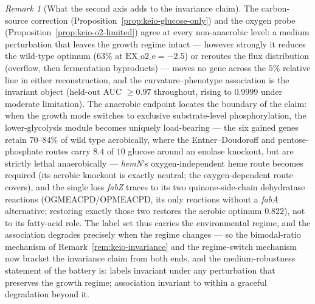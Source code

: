 \documentclass[11pt,a4paper]{article}
\theoremstyle{plain}
\theoremstyle{definition}
\theoremstyle{remark}
\newtheorem{remark}[theorem]{Remark}
\begin{document}
\begin{remark}[What the second axis adds to the invariance claim]
\label{rem:keio-o2-invariance}
The carbon-source correction
(Proposition~\ref{prop:keio-glucose-only}) and the oxygen probe
(Proposition~\ref{prop:keio-o2-limited}) agree at every
non-anaerobic level: a medium perturbation that leaves the growth
regime intact --- however strongly it reduces the wild-type optimum
($63\%$ at $\mathrm{EX\_o2\_e}=-2.5$) or reroutes the flux
distribution (overflow, then fermentation byproducts) --- moves no
gene across the $5\%$ relative line in either reconstruction, and
the curvature--phenotype association is the invariant object
(held-out AUC $\ge 0.97$ throughout, rising to $0.9999$ under
moderate limitation). The anaerobic endpoint locates the boundary of
the claim: when the growth mode switches to exclusive
substrate-level phosphorylation, the lower-glycolysis module becomes
uniquely load-bearing --- the six gained genes retain $70$--$84\%$
of wild type aerobically, where the Entner--Doudoroff and
pentose-phosphate routes carry $8.4$ of $10$ glucose around an
enolase knockout, but are strictly lethal anaerobically ---
\emph{hemN}'s oxygen-independent heme route becomes required (its
aerobic knockout is exactly neutral; the oxygen-dependent route
covers), and the single loss \emph{fabZ} traces to its two
quinone-side-chain dehydratase reactions (OGMEACPD/OPMEACPD, its
only reactions without a \emph{fabA} alternative; restoring exactly
those two restores the aerobic optimum $0.822$), not to its
fatty-acid role. The label set thus carries the environmental
regime, and the association degrades precisely when the regime
changes --- so the bimodal-ratio mechanism of
Remark~\ref{rem:keio-invariance} and the regime-switch mechanism
now bracket the invariance claim from both ends, and the
medium-robustness statement of the battery is: labels invariant
under any perturbation that preserves the growth regime;
association invariant to within a graceful degradation beyond it.
\end{remark}
\end{document}
